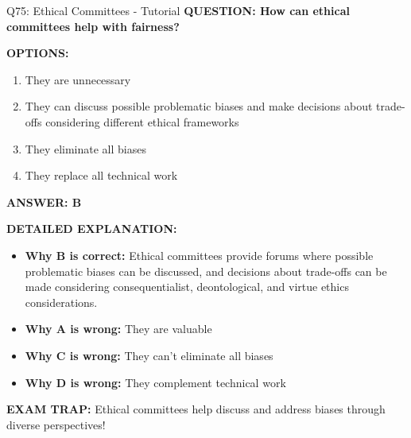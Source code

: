 \documentclass[8pt]{beamer}
\begin{document}
	\begin{frame}{Q75: Ethical Committees - Tutorial}
		\fontsize{6.5}{7.5}\selectfont
		\textbf{QUESTION: How can ethical committees help with fairness?}
		
		\vspace{0.1cm}
		\textbf{OPTIONS:}
		\begin{enumerate}
			\item They are unnecessary
			\item They can discuss possible problematic biases and make decisions about trade-offs considering different ethical frameworks
			\item They eliminate all biases
			\item They replace all technical work
		\end{enumerate}
		
		\vspace{0.1cm}
		\textcolor{myblue}{\textbf{ANSWER: B}}
		
		\vspace{0.1cm}
		\textbf{DETAILED EXPLANATION:}
		\begin{itemize}
			\item \textbf{Why B is correct:} Ethical committees provide forums where possible problematic biases can be discussed, and decisions about trade-offs can be made considering consequentialist, deontological, and virtue ethics considerations.
			\item \textbf{Why A is wrong:} They are valuable
			\item \textbf{Why C is wrong:} They can't eliminate all biases
			\item \textbf{Why D is wrong:} They complement technical work
		\end{itemize}
		
		\textcolor{myred}{\textbf{EXAM TRAP:}} Ethical committees help \textcolor{myblue}{discuss and address biases} through diverse perspectives!
	\end{frame}
	
	
\end{document}
